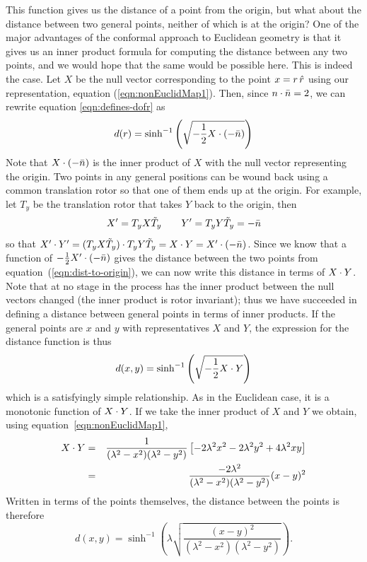 This function gives us the distance of a point from the
origin, but what about the distance between two general
points, neither of which is at the origin? One of the
major advantages of the conformal approach to Euclidean
geometry is that it gives us an inner product formula for
computing the distance between any two points, and we
would hope that the same would be possible here. This is
indeed the case. Let $X$ be the null vector corresponding
to the point $x=r\, \hat{r}$ using our representation,
equation (\ref{eqn:nonEuclidMap1}). Then, since $n\cdot\bar{n} =
2$, we can rewrite equation \ref{eqn:defines-dofr} as
%
\begin{equation} \label{eqn:dist-to-origin}
d(r) = \sinh^{-1}\left(\sqrt{-\frac{1}{2} X \cdot (-\bar{n}) }
\right)
\end{equation}
%
Note that $X \cdot (-\bar{n})$ is the inner product of $X$ with the
null vector representing the origin. Two points in any
general positions can be wound back using a common
translation rotor so that one of them ends up at the
origin. For example, let $T_y$ be the translation rotor
that takes $Y$ back to the origin, then
%
\[ X' = T_y X \tilde{T}_y \qquad  Y' = T_y Y \tilde{T}_y
= -\bar{n}
\]
%
so that $X'\cdot Y' = (T_y X \tilde{T}_y)\cdot T_y Y \tilde{T}_y =
X\cdot Y =  X'\cdot (-\bar{n})$. Since we know that a function of $-\frac{1}{2}
X'\cdot (-\bar{n})$ gives the distance between the two points from
equation~(\ref{eqn:dist-to-origin}), we can now write this
distance in terms of $X\cdot Y$. Note that at no stage in the
process has the inner product between the null vectors changed (the
inner product is rotor invariant); thus we have succeeded in
defining a distance between general points in terms of inner
products. If the general points are $x$ and $y$ with
representatives $X$ and $Y$, the expression for the distance
function is thus
%
\begin{equation}\label{eqn:general-dist-formula}
d(x,y) = \sinh^{-1}\left(\sqrt{-\frac{1}{2} X \cdot Y }
\right)
\end{equation}
%
which is a satisfyingly simple relationship. As in the
Euclidean case, it is a monotonic function of $X\cdot Y$.
If we take the inner product of $X$ and $Y$ we obtain,
using equation~\ref{eqn:nonEuclidMap1},
%
\begin{eqnarray}
X\cdot Y  & = &
\frac{1}{(\lambda^2-x^2)(\lambda^2-y^2)}\left[-2\lambda^2x^2-2\lambda^2y^2+4\lambda^2xy\right] \nonumber \\
  &  =  &
  \frac{-2\lambda^2}{(\lambda^2-x^2)(\lambda^2-y^2)}(x-y)^2
  \end{eqnarray}
%
Written in terms of the points themselves, the distance
between the points is therefore
%
\begin{equation}\label{eqn:general-dist-formula-points}
d(x,y) = \sinh^{-1}\left(\lambda
\sqrt{\frac{(x-y)^2}{(\lambda^2-x^2)(\lambda^2-y^2)} }
\right).
\end{equation}
%

